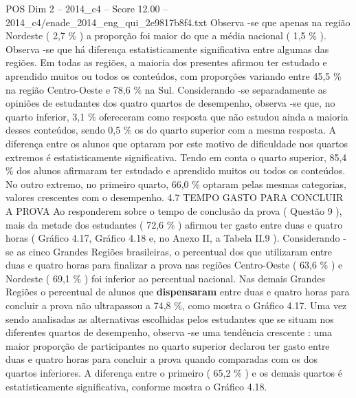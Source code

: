 \begin{textsample}{POS Dim 2 – 2014\_c4 – Score 12.00 – 2014\_c4/enade\_2014\_eng\_qui\_2e9817b8f4.txt}
Observa -se que apenas na região Nordeste ( 2,7 \% ) a proporção foi maior do que a média nacional ( 1,5 \% ).
Observa -se que há diferença estatisticamente significativa entre algumas das regiões.
Em todas as regiões, a maioria dos presentes afirmou ter estudado e aprendido muitos ou todos os conteúdos, com proporções variando entre 45,5 \% na região Centro-Oeste e 78,6 \% na Sul.
Considerando -se separadamente as opiniões de estudantes dos quatro quartos de desempenho, observa -se que, no quarto inferior, 3,1 \% ofereceram como resposta que não estudou ainda a maioria desses conteúdos, sendo 0,5 \% os do quarto superior com a mesma resposta.
A diferença entre os alunos que optaram por este motivo de dificuldade nos quartos extremos é estatisticamente significativa.
Tendo em conta o quarto superior, 85,4 \% dos alunos afirmaram ter estudado e aprendido muitos ou todos os conteúdos.
No outro extremo, no primeiro quarto, 66,0 \% optaram pelas mesmas categorias, valores crescentes com o desempenho. 4.7 TEMPO GASTO PARA CONCLUIR A PROVA Ao responderem sobre o tempo de conclusão da prova ( Questão 9 ), mais da metade dos estudantes ( 72,6 \% ) afirmou ter gasto entre duas e quatro horas ( Gráfico 4.17, Gráfico 4.18 e, no Anexo II, a Tabela II.9 ).
Considerando -se as cinco Grandes Regiões brasileiras, o percentual dos que utilizaram entre duas e quatro horas para finalizar a prova nas regiões Centro-Oeste ( 63,6 \% ) e Nordeste ( 69,1 \% ) foi inferior ao percentual nacional.
Nas demais Grandes Regiões o percentual de alunos que \textbf{dispensaram} entre duas e quatro horas para concluir a prova não ultrapassou a 74,8 \%, como mostra o Gráfico 4.17.
Uma vez sendo analisadas as alternativas escolhidas pelos estudantes que se situam nos diferentes quartos de desempenho, observa -se uma tendência crescente : uma maior proporção de participantes no quarto superior declarou ter gasto entre duas e quatro horas para concluir a prova quando comparadas com os dos quartos inferiores.
A diferença entre o primeiro ( 65,2 \% ) e os demais quartos é estatisticamente significativa, conforme mostra o Gráfico 4.18.

\end{textsample}
